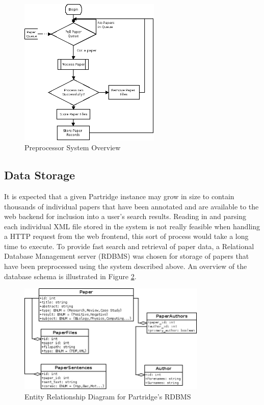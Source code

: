 \begin{figure}[!h]
\vspace{5mm}
\centering
\includegraphics[width=0.6\textwidth]{images/design/paper_processor_overview.png}
\caption{Preprocessor System Overview}
\label{fig:preprocessor_overview}
\end{figure}


\subsection{ Data Storage }
It is expected that a given Partridge instance may grow in size to contain
thousands of individual papers that have been annotated and are available to
the web backend for inclusion into a user's search results. Reading in and
parsing each individual XML file stored in the system is not really feasible
when handling a HTTP request from the web frontend, this sort of process would
take a long time to execute. To provide fast search and retrieval of paper
data, a Relational Database Management server (RDBMS) was chosen for storage of
papers that have been preprocessed using the system described above. An
overview of the database schema is illustrated in Figure \ref{fig:e-r-diagram}.

\begin{figure}[th]
\vspace{5mm}
\centering
\includegraphics[width=0.8\textwidth]{images/design/e-r-diagram.png}
\caption{Entity Relationship Diagram for Partridge's RDBMS}
\label{fig:e-r-diagram}
\end{figure}

